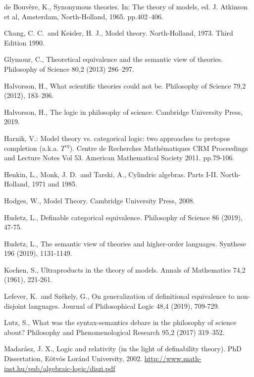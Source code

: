 \documentclass[12pt,leqno]{article}
\begin{document}
\begin{thebibliography}{}
 de Bouv{\`e}re, K., Synonymous theories. In: The theory of models, 
ed. J. Atkinson et al, Amsterdam, North-Holland, 1965. pp.402--406.

 Chang, C. C.\ and Keisler, H. J., Model theory.
North-Holland, 1973. Third Edition 1990.



 Glymour, C., Theoretical equivalence and the semantic view of theories. 
Philosophy of Science 80,2 (2013) 286--297.

 Halvorson, H., What scientific theories could not be.
Philosophy of Science 79,2 (2012), 183--206.

 Halvorson, H., The logic in philosophy of
science. Cambridge University Press, 2019.

 Harnik, V.: Model theory vs. categorical logic: two
approaches to pretopos completion (a.k.a. $T^{eq}$). Centre de
Recherches Math\'ematiques CRM Proceedings and Lecture Notes Vol 53.
American Mathematical Society 2011. pp.79-106.

 Henkin, L., Monk, J. D.\ and Tarski, A., Cylindric
algebras. Parts I-II. North-Holland, 1971 and 1985.

 Hodges, W., Model Theory. Cambridge University Press, 2008.

 Hudetz, L., Definable categorical equivalence.
Philosophy of Science 86 (2019), 47-75.

 Hudetz, L., The semantic view of theories and
higher-order languages. Synthese 196 (2019), 1131-1149.

 Kochen, S., Ultraproducts in the theory of models. 
Annals of Mathematics 74,2 (1961), 221-261.

 Lefever, K.\ and Sz\'ekely, G., On generalization of
definitional equivalence to non-disjoint languages. Journal of
Philosophical Logic 48,4 (2019), 709-729.

 Lutz, S., What was the syntax-semantics debare in the philosophy 
of science about? Philosophy and Phenomenological Research 95,2 (2017) 319--352.

 Madar\'asz, J. X., Logic and relativity (in the
light of definability theory). PhD Dissertation, E\"otv\"os Lor\'and
University, 2002.
\url{http://www.math-inst.hu/pub/algebraic-logic/diszi.pdf}


\end{thebibliography}
\end{document}
